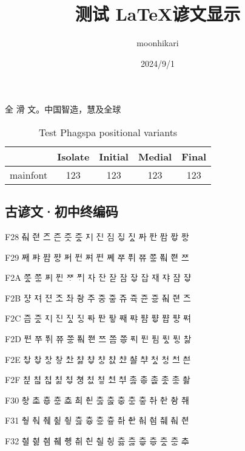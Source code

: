 \documentclass{article}
\begin{document}
\title{测试 \LaTeX 谚文显示}
\author{moonhikari}
\date{2024/9/1}
\maketitle

全 滑 文。中国智造，慧及全球

\begin{table}[htbp]
    \caption{Test Phagspa positional variants}
    \centering
    \begin{tabular}{r|cccc}
        \hline
         & Isolate & Initial & Medial & Final\\
         \hline
        mainfont & 123 & 123 & 123 & 123\\
        \hline
    \end{tabular}
    
    \label{tab:my_label}
  \end{table}

\zhlipsum[1]

\subsection*{古谚文·初中终编码}

{
\oldjamo
F28 ᅎᆑ	ᅎᆑᆫ	ᅎᅳ	ᅎᅳᆫ	ᅎᅳᆺ	ᅎᅳᇫ	ᅎᅵ	ᅎᅵᆫ	ᅎᅵᆷ	ᅎᅵᇢ	ᅎᅵᇫ	ᅏᅡ	ᅏᅡᆫ	ᅏᅡᆷ	ᅏᅡᇢ	ᅏᅡᇰ \par
F29	ᅏᅢ	ᅏᅣ	ᅏᅣᆷ	ᅏᅣᇰ	ᅏᅥ	ᅏᅥᆫ	ᅏᅧ	ᅏᅧᆫ	ᅏᅨ	ᅏᅮ	ᅏᅱ	ᅏᅲ	ᅏᅲᇰ	ᅏᆑ	ᅏᆑᆫ	ᅏᅳ \par
F2A	ᅏᅳᇫ	ᅏᅳᇰ	ᅏᅵ	ᅏᅵᆫ	ᅏᆞ	ᅏᆡ	ᅐᅡ	ᅐᅡᆫ	ᅐᅡᆮ	ᅐᅡᆷ	ᅐᅡᇢ	ᅐᅡᆸ	ᅐᅢ	ᅐᅣ	ᅐᅣᆷ	ᅐᅣᇢ \par
F2B	ᅐᅣᇰ	ᅐᅧ	ᅐᅧᆫ	ᅐᅩ	ᅐᅪ	ᅐᅪᆼ	ᅐᅮ	ᅐᅮᆼ	ᅐᅮᇹ	ᅐᅲ	ᅐᅲᆨ	ᅐᅲᆫ	ᅐᅲᇰ	ᅐᆑ	ᅐᆑᆫ	ᅐᅳ \par
F2C	ᅐᅳᆷ	ᅐᅳᇫ	ᅐᅵ	ᅐᅵᆫ	ᅐᅵᇫ	ᅐᅵᇰ	ᅑᅡ	ᅑᅡᆫ	ᅑᅡᇂ	ᅑᅢ	ᅑᅣ	ᅑᅣᆷ	ᅑᅣᇢ	ᅑᅣᆸ	ᅑᅣᇰ	ᅑᅧ \par
F2D	ᅑᅧᆫ	ᅑᅮ	ᅑᅱ	ᅑᅲ	ᅑᅲᇰ	ᅑᆑ	ᅑᆑᆫ	ᅑᅳ	ᅑᅳᆷ	ᅑᅳᇢ	ᅑᅵ	ᅑᅵᆫ	ᅑᅵᆷ	ᅑᅵᇫ	ᅑᅵᇰ	차ᇙ \par
F2E	차ᇢ  차ᇦ	차ᇰ	차ᇹ	ᄎᅶ	챠ᇙ	챠ᇦ	챠ᇰ	챠ᇱ	ᄎᅸ	ᄎᅸᆯ	ᄎᆤ	처ᇫ	처ᇰ	ᄎᅼ	ᄎᅼᆫ \par
F2F	쳐ퟍ	쳐ퟎ	쳐ퟏ	쳐ᇙ	쳐ᇢ	쳐ᇰ	쳐ᇱ	쳐ᇹ	ᄎᅽ	ᄎᅾ	초ᇙ	초ᇢ	초ퟨ	초ᇫ	초ᇰ	촤ᇙ \par
F30	촤ᇰ	ᄎᆂ	쵸ᇢ	쵸ᇰ	ᄎᆇ	ᄎᆈ	ᄎᆈᆫ	추ᇙ	추ᇠ	추ᇢ	추ᇰ	추ᇹ	ᄎᆉ	ᄎᆉᆫ	ᄎᆉᆼ	ᄎᆊ \par
F31	춰ᇹ	ᄎힵ	ᄎᆌ	취ᇙ	취ᇹ	츄ᇙ	츄ᇢ	츄ᇰ	츄ᇹ	ᄎᆎ	ᄎᆎᆫ	ᄎᆏ	ᄎᆏᆷ	ᄎᆐ	ᄎᆑ	ᄎᆑᆫ \par
F32	ᄎᆑᆯ	ᄎᆑᇙ	ᄎᆑᆷ	ᄎᆒ	ᄎᆒᆼ	ᄎᆔ	ᄎᆔᆫ	ᄎᆔᆯ	ᄎᆔᆼ	츠ퟛ	츠ᇙ	츠ퟝ	츠ᇢ	츠ᇫ	츠ᇰ	ᄎᆕ 
}
    
\end{document}
